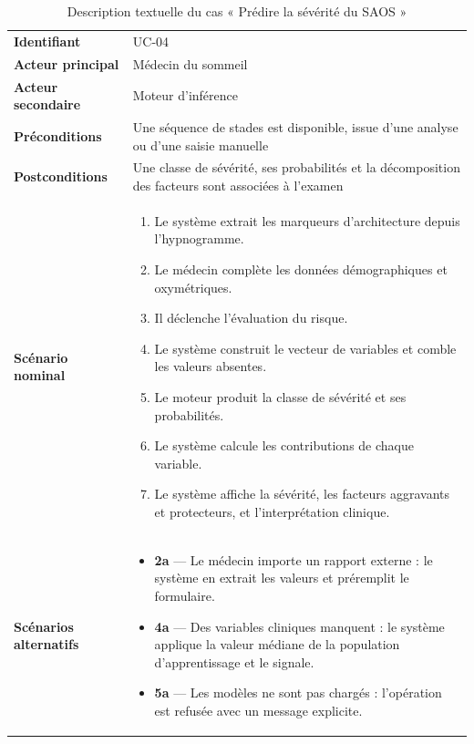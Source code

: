 \begin{table}[H]
\centering

\small
\begin{tabular}{@{}L{3.0cm}L{11.4cm}@{}}
\toprule
\textbf{Identifiant} & UC-04 \\
\textbf{Acteur principal} & Médecin du sommeil \\
\textbf{Acteur secondaire} & Moteur d'inférence \\
\textbf{Préconditions} & Une séquence de stades est disponible, issue d'une analyse ou
d'une saisie manuelle \\
\textbf{Postconditions} & Une classe de sévérité, ses probabilités et la décomposition
des facteurs sont associées à l'examen \\
\midrule
\textbf{Scénario nominal} &
\begin{minipage}[t]{11.2cm}
\begin{enumerate}[leftmargin=1.1em,itemsep=1pt,topsep=2pt]
  \item Le système extrait les marqueurs d'architecture depuis l'hypnogramme.
  \item Le médecin complète les données démographiques et oxymétriques.
  \item Il déclenche l'évaluation du risque.
  \item Le système construit le vecteur de variables et comble les valeurs absentes.
  \item Le moteur produit la classe de sévérité et ses probabilités.
  \item Le système calcule les contributions de chaque variable.
  \item Le système affiche la sévérité, les facteurs aggravants et protecteurs, et
        l'interprétation clinique.
\end{enumerate}
\end{minipage} \\
\midrule
\textbf{Scénarios alternatifs} &
\begin{minipage}[t]{11.2cm}
\begin{itemize}[leftmargin=1.1em,itemsep=1pt,topsep=2pt]
  \item \textbf{2a} --- Le médecin importe un rapport externe : le système en extrait
        les valeurs et préremplit le formulaire.
  \item \textbf{4a} --- Des variables cliniques manquent : le système applique la
        valeur médiane de la population d'apprentissage et le signale.
  \item \textbf{5a} --- Les modèles ne sont pas chargés : l'opération est refusée avec
        un message explicite.
\end{itemize}
\end{minipage} \\
\bottomrule
\end{tabular}
\caption{Description textuelle du cas « Prédire la sévérité du SAOS »}
\label{tab:desc-osa}
\end{table}

